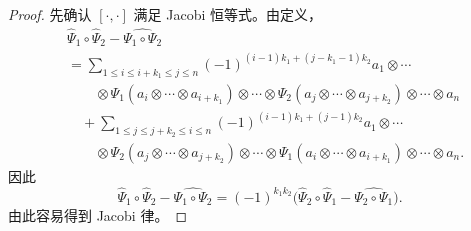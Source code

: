 \begin{proof}
  先确认 $[\cdot,\cdot]$ 满足 Jacobi 恒等式。由定义，
  \begin{align*}
    &\hat\Psi_1\circ\hat\Psi_2-\widehat{\Psi_1\circ\Psi_2}\\
    &=\sum_{1\le i\le i+k_1\le j\le n}(-1)^{(i-1)k_1+(j-k_1-1)k_2}a_1\otimes\cdots\\
    &\qquad\otimes\Psi_1(a_i\otimes\cdots\otimes a_{i+k_1})\otimes\cdots
     \otimes\Psi_2(a_j\otimes\cdots\otimes a_{j+k_2})\otimes\cdots\otimes a_n\\
    &\quad+\sum_{1\le j\le j+k_2\le i\le n}(-1)^{(i-1)k_1+(j-1)k_2}a_1\otimes\cdots\\
    &\qquad\otimes\Psi_2(a_j\otimes\cdots\otimes a_{j+k_2})\otimes\cdots
     \otimes\Psi_1(a_i\otimes\cdots\otimes a_{i+k_1})\otimes\cdots\otimes a_n.
  \end{align*}
  因此
  \[
    \hat\Psi_1\circ\hat\Psi_2-\widehat{\Psi_1\circ\Psi_2}
    =(-1)^{k_1k_2}\bigl(\hat\Psi_2\circ\hat\Psi_1-\widehat{\Psi_2\circ\Psi_1}\bigr).
  \]
  由此容易得到 Jacobi 律。

\end{proof}


